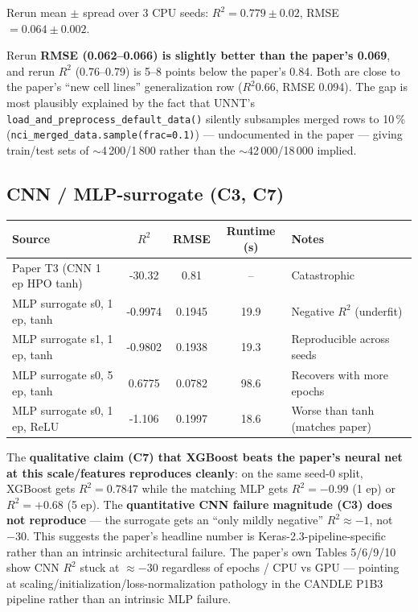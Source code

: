 \documentclass[11pt]{article}
\begin{document}
Rerun mean $\pm$ spread over 3 CPU seeds: $R^2 = 0.779 \pm 0.02$, RMSE $= 0.064 \pm 0.002$.

Rerun \textbf{RMSE (0.062--0.066) is slightly better than the paper's 0.069}, and rerun $R^2$ (0.76--0.79) is 5--8 points below the paper's 0.84. Both are close to the paper's ``new cell lines'' generalization row ($R^2 0.66$, RMSE 0.094). The gap is most plausibly explained by the fact that UNNT's \texttt{load\_and\_preprocess\_default\_data()} silently subsamples merged rows to 10\,\% (\texttt{nci\_merged\_data.sample(frac=0.1)}) --- undocumented in the paper --- giving train/test sets of $\sim$4\,200/1\,800 rather than the $\sim$42\,000/18\,000 implied.

\subsection{CNN / MLP-surrogate (C3, C7)}

\begin{center}
\begin{tabular}{@{}l S[table-format=-2.4] S[table-format=1.4] S[table-format=3.1] l@{}}
\toprule
Source & {$R^2$} & {RMSE} & {Runtime (s)} & Notes \\
\midrule
Paper T3 (CNN 1 ep HPO tanh) & -30.32 & 0.81 & {--} & Catastrophic \\
MLP surrogate s0, 1 ep, tanh & -0.9974 & 0.1945 & 19.9 & Negative $R^2$ (underfit) \\
MLP surrogate s1, 1 ep, tanh & -0.9802 & 0.1938 & 19.3 & Reproducible across seeds \\
MLP surrogate s0, 5 ep, tanh & 0.6775 & 0.0782 & 98.6 & Recovers with more epochs \\
MLP surrogate s0, 1 ep, ReLU & -1.106 & 0.1997 & 18.6 & Worse than tanh (matches paper) \\
\bottomrule
\end{tabular}
\end{center}

The \textbf{qualitative claim (C7) that XGBoost beats the paper's neural net at this scale/features reproduces cleanly}: on the same seed-0 split, XGBoost gets $R^2 = 0.7847$ while the matching MLP gets $R^2 = -0.99$ (1 ep) or $R^2 = +0.68$ (5 ep). The \textbf{quantitative CNN failure magnitude (C3) does not reproduce} --- the surrogate gets an ``only mildly negative'' $R^2 \approx -1$, not $-30$. This suggests the paper's headline number is Keras-2.3-pipeline-specific rather than an intrinsic architectural failure. The paper's own Tables 5/6/9/10 show CNN $R^2$ stuck at $\approx -30$ regardless of epochs / CPU vs GPU --- pointing at scaling/initialization/loss-normalization pathology in the CANDLE P1B3 pipeline rather than an intrinsic MLP failure.
\end{document}

